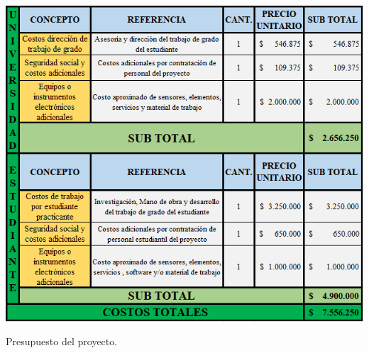 


	\begin{table}[H]
		\begin{center}
			\includegraphics[scale=0.9]{img/presuTot3.png}
		\end{center}
		\caption{Presupuesto del proyecto. \label{tabpresupuesto}}
	\end{table}

 
